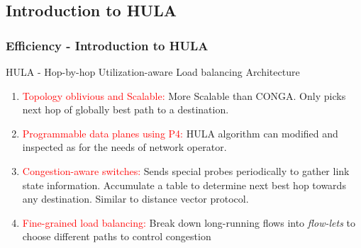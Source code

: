 \documentclass{beamer}
\begin{document}
\subsection{Introduction to HULA }
\begin{frame}
	\frametitle{Efficiency -  Introduction to HULA}
	HULA - Hop-by-hop Utilization-aware Load balancing Architecture \\
	\begin{enumerate}
		\item\textcolor{red}{Topology oblivious and Scalable:} More Scalable than CONGA. Only picks next hop of globally best path to a destination.
		\item\textcolor{red}{Programmable data planes using P4:} HULA algorithm can modified and inspected as for the needs of network operator.
		\item\textcolor{red}{Congestion-aware switches:} Sends special probes periodically to gather link state information. Accumulate a table to determine next best hop towards any destination. Similar to distance vector protocol.
		\item\textcolor{red}{Fine-grained load balancing:} Break down long-running flows into \textit{flow-lets} to choose different paths to control congestion
	\end{enumerate}
\end{frame}

\end{document}
